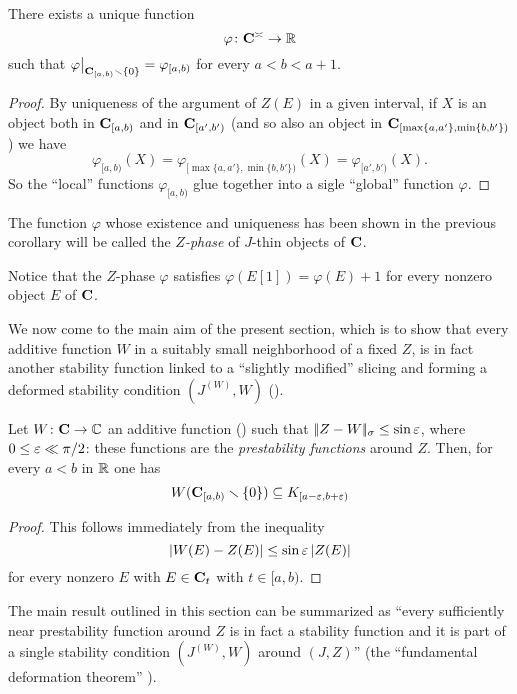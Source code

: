 \begin{corollary}
There exists a unique function
\[
\varphi\colon \mathbf{C}^\asymp\to \mathbb{R}
\]
such that $\varphi\bigr\vert_{\mathbf{C}_{[a,b)}\smallsetminus \{0\}}=\varphi_{[a,b)}$ for every $a<b<a+1$.
\end{corollary}
\begin{proof}
By uniqueness of the argument of $Z(E)$ in a given interval, if $X$ is an object both in $\mathbf{C}_{[a,b)}$ and in $\mathbf{C}_{[a',b')}$ (and so also an object in $\mathbf{C}_{[\text{max}\{a,a'\},\text{min}\{b,b'\})}$) we have
\[
\varphi_{[a,b)}(X)=\varphi_{[\max\{a,a'\},\min\{b,b'\})}(X)=\varphi_{[a',b')}(X).
\]
So the ``local'' functions $\varphi_{[a,b)}$ glue together into a sigle ``global'' function $\varphi$.
\end{proof}
\begin{definition}
The function $\varphi$ whose existence and uniqueness has been shown in the previous corollary will be called the \emph{$Z$\hyp{}phase} of $J$\hyp{}thin objects of $\mathbf{C}$.
\end{definition}
Notice that the $Z$\hyp{}phase $\varphi$ satisfies $\varphi(E[1])=\varphi(E)+1$ for every nonzero object $E$ of $\mathbf{C}$.

We now come to the main aim of the present section, which is to show that every additive function $W$ in a suitably small neighborhood of a fixed $Z$, is in fact another stability function linked to a ``slightly modified'' slicing and forming a deformed stability condition $(J^{(W)}, W)$ (\adef {}).
\begin{df-prop}
Let $W\colon \mathbf{C}\to\mathbb{C}$ an additive function (\adef {}) such that $|\!|Z-W|\!|_\sigma \le\sin\varepsilon$, where $0 \le \varepsilon \ll\pi/2$: these functions are the \emph{prestability functions} around $Z$. Then, for every $a<b$ in $\mathbb{R}$ one has
\[
W(\mathbf{C}_{[a,b)}\smallsetminus \{0\}) \subseteq K_{[a-\varepsilon ,b+\varepsilon )}\]
\end{df-prop}
\begin{proof}
This follows immediately from the inequality
\[
|W(E)-Z(E)|\leq \sin \varepsilon \, |Z(E)|
\]
for every nonzero $E$ with $E\in \mathbf{C}_{t}$ with $t\in [a,b)$.
\end{proof}
\begin{remark}
The main result outlined in this section can be summarized as ``every sufficiently near prestability function around $Z$ is in fact a stability function and it is part of a single stability condition $(J^{(W)}, W)$ around $(J,Z)$'' (the ``fundamental deformation theorem'' ).
\end{remark}

